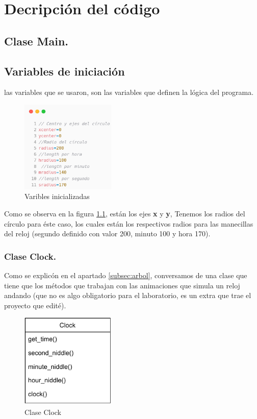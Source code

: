 \chapter{Decripción del código} \label{chap:descripcion_codigo}
\section{Clase Main.} \label{sec:main}
\section{Variables de iniciación} \label{subsec:variables}
las variables que se usaron, son las variables que definen la lógica del programa.

\begin{figure}[H]
\centering
\includegraphics[width=0.4\textwidth]{../img/chapter02/2.png}
\caption{Varibles inicializadas}
\label{fig:variables_iniciales}
\end{figure}

Como se observa en la figura \ref{fig:variables_iniciales}, están los ejes \textbf{x} y \textbf{y}, Tenemos los radios del círculo para éste caso, los cuales están los respectivos radios para las manecillas del reloj (segundo definido con valor 200, minuto 100 y hora 170).

\subsection{Clase Clock.} \label{subsec:clock}
Como se explicón en el apartado \ref{subsec:arbol}, conversamos de una clase que tiene que los métodos que trabajan con las animaciones que simula un reloj andando (que no es algo obligatorio para el laboratorio, es un extra que trae el proyecto que edité).

\begin{figure}[H]
	\centering
	\includegraphics[width=0.4\textwidth]{../img/chapter02/4.pdf}
	\caption{Clase Clock}
	\label{fig:clock}
\end{figure}

